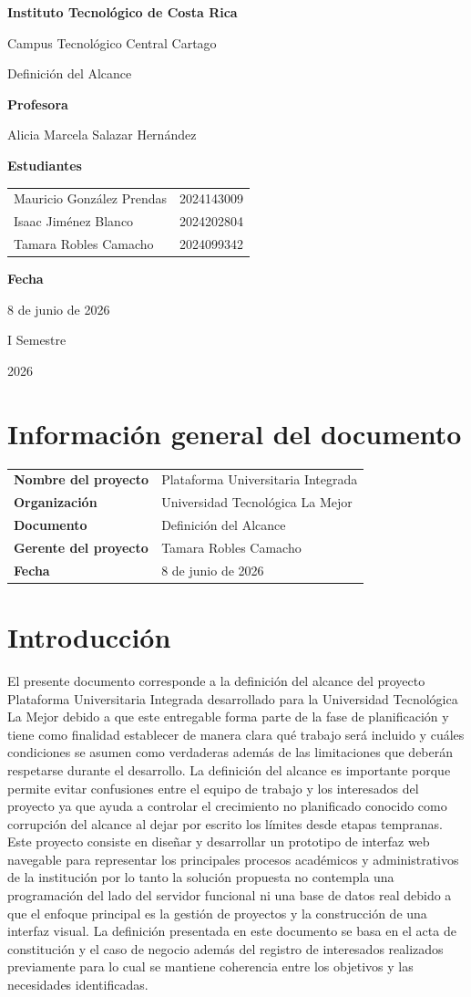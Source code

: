 \documentclass[11pt,spanish]{article}
\title{\DocumentoTitulo}
\author{\AutoresPortada}
\date{\FechaDocumento}
\makeatletter
\newcommand{\Institucion}{Instituto Tecnológico de Costa Rica}
\newcommand{\Campus}{Campus Tecnológico Central Cartago}
\newcommand{\DocumentoTitulo}{Definición del Alcance}
\newcommand{\Profesor}{Alicia Marcela Salazar Hernández}
\newcommand{\FechaDocumento}{8 de junio de 2026}
\newcommand{\PeriodoAcademico}{I Semestre}
\newcommand{\AnioDocumento}{2026}
\newcommand{\AutoresPortada}{%
    \begin{tabular}{l@{\hspace{1.5cm}}r}
        Mauricio González Prendas & 2024143009\\
        Isaac Jiménez Blanco & 2024202804\\
        Tamara Robles Camacho & 2024099342
    \end{tabular}%
}
\newcommand{\MakeCover}{%
\begin{titlepage}
\thispagestyle{empty}
\centering

{\bfseries \huge \Institucion \par}
\vspace{0.25cm}
{\LARGE \Campus \par}

\vfill

{\huge \DocumentoTitulo \par}

\vfill

{\bfseries \LARGE Profesora \par}
{\Large \Profesor \par}

\vfill

{\bfseries \LARGE Estudiantes \par}
{\Large \AutoresPortada \par}

\vfill

{\bfseries\LARGE Fecha \par}
{\Large \FechaDocumento \par}

\vfill

{\LARGE \PeriodoAcademico \par}
{\LARGE \AnioDocumento \par}

\end{titlepage}%
}
\makeatother
\begin{document}
\hypersetup{pageanchor=false}

\MakeCover

\pagestyle{empty}
\tableofcontents
\clearpage
{}
\hypersetup{pageanchor=true}
\pagestyle{fancy}

\section{Información general del documento}

\begin{table}[H]
\centering
\begin{tabularx}{\textwidth}{L{5cm} Y}
\toprule
\textbf{Nombre del proyecto} & Plataforma Universitaria Integrada \\
\textbf{Organización} & Universidad Tecnológica La Mejor \\
\textbf{Documento} & \DocumentoTitulo \\
\textbf{Gerente del proyecto} & Tamara Robles Camacho \\
\textbf{Fecha} & \FechaDocumento \\
\bottomrule
\end{tabularx}
\end{table}

\section{Introducción}

El presente documento corresponde a la definición del alcance del proyecto Plataforma Universitaria Integrada desarrollado para la Universidad Tecnológica La Mejor debido a que este entregable forma parte de la fase de planificación y tiene como finalidad establecer de manera clara qué trabajo será incluido y cuáles condiciones se asumen como verdaderas además de las limitaciones que deberán respetarse durante el desarrollo. La definición del alcance es importante porque permite evitar confusiones entre el equipo de trabajo y los interesados del proyecto ya que ayuda a controlar el crecimiento no planificado conocido como corrupción del alcance al dejar por escrito los límites desde etapas tempranas. Este proyecto consiste en diseñar y desarrollar un prototipo de interfaz web navegable para representar los principales procesos académicos y administrativos de la institución por lo tanto la solución propuesta no contempla una programación del lado del servidor funcional ni una base de datos real debido a que el enfoque principal es la gestión de proyectos y la construcción de una interfaz visual. La definición presentada en este documento se basa en el acta de constitución y el caso de negocio además del registro de interesados realizados previamente para lo cual se mantiene coherencia entre los objetivos y las necesidades identificadas.
\end{document}
